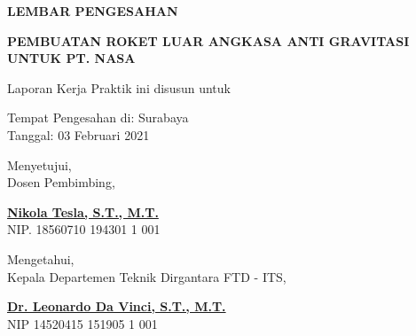 \begin{center}
  {\Large \textbf{LEMBAR PENGESAHAN}}
  \vspace{6ex}


  {\large \textbf{PEMBUATAN ROKET LUAR ANGKASA ANTI GRAVITASI UNTUK PT. NASA}}
  \vspace{6ex}

  Laporan Kerja Praktik ini disusun untuk \lipsum[1][1]
  \vspace{2ex}

  Tempat Pengesahan di: Surabaya \\
  Tanggal: 03 Februari 2021
  \vspace{8ex}

  Menyetujui, \\
  Dosen Pembimbing,
  \vspace{12ex}

  \textbf{\underline{Nikola Tesla, S.T., M.T.}} \\
  NIP. 18560710 194301 1 001
  \vspace{8ex}

  Mengetahui, \\
  Kepala Departemen Teknik Dirgantara FTD - ITS,
  \vspace{12ex}

  \textbf{\underline{Dr. Leonardo Da Vinci, S.T., M.T.}} \\
  NIP 14520415 151905 1 001

\end{center}